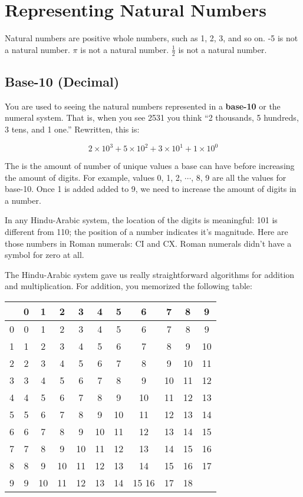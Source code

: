 \chapter{Representing Natural Numbers}

Natural numbers are positive whole numbers, such as 1, 2, 3, and so on. -5 is not a natural
number. $\pi$ is not a natural number. $\frac{1}{2}$ is not a natural
number.

\section{Base-10 (Decimal)}
You are used to seeing the natural numbers represented in a \textbf{base-10}
 or the  numeral system. That is, when you see 2531 you
think ``2 thousands, 5 hundreds, 3 tens, and 1 one.'' Rewritten, this is:

$$2 \times 10^3 + 5 \times 10^2 + 3 \times 10^1 + 1 \times 10^0$$

The  is the amount of number of unique values a base can have before increasing the amount of digits. 
For example, values 0, 1, 2, $\cdots$, 8, 9 are all the values for base-10. 
Once 1 is added added to 9, we need to increase the amount of digits in a number. 

In any Hindu-Arabic system, the location of the digits is meaningful:
101 is different from 110; the position of a number indicates it's magnitude. Here are those numbers in Roman numerals:
CI and CX. Roman numerals didn't have a symbol for zero at all.

The Hindu-Arabic system gave us really straightforward algorithms for
addition and multiplication. For addition, you memorized the following table:

\begin{tabular}{ c || c | c | c | c | c | c| c| c| c| c }
 & 0 & 1 & 2 & 3 & 4 & 5 & 6 & 7 & 8 & 9 \\
 \hline
0 & 0 & 1 & 2 & 3 & 4 & 5 & 6 & 7 & 8 & 9 \\
1 & 1 & 2 & 3 & 4 & 5 & 6 & 7 & 8 & 9 & 10 \\
2 & 2 & 3 & 4 & 5 & 6 & 7 & 8 & 9 & 10 & 11\\
3 & 3 & 4 & 5 & 6 & 7 & 8 & 9 & 10 & 11 & 12\\
4 & 4 & 5 & 6 & 7 & 8 & 9 & 10 & 11 & 12 & 13\\
5 & 5 & 6 & 7 & 8 & 9 & 10 & 11 & 12 & 13 & 14\\
6 & 6 & 7 & 8 & 9 & 10 & 11 & 12 & 13 & 14 & 15\\
7 & 7 & 8 & 9 & 10 & 11 & 12 & 13 & 14 & 15 & 16\\
8 & 8 & 9 & 10 & 11 & 12 & 13 & 14 & 15 & 16 & 17\\
9 & 9 & 10 & 11 & 12 & 13 & 14 & 15 16 & 17 & 18\\
\end{tabular}

